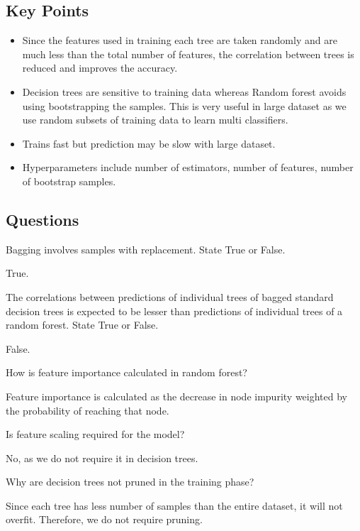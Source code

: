 \documentclass[12pt,letterpaper, onecolumn]{exam}
\begin{document}
\subsection*{Key Points}
\begin{itemize}
\item Since the features used in training each tree are taken randomly and are much less than the total number of features, the correlation between trees is reduced and improves the accuracy.
\item Decision trees are sensitive to training data whereas Random forest avoids using bootstrapping the samples. This is very useful in large dataset as we use random subsets of training data to learn multi classifiers.
\item Trains fast but prediction may be slow with large dataset.
\item Hyperparameters include number of estimators, number of features, number of bootstrap samples.
\end{itemize}

\subsection*{Questions}
\begin{questions}
\question[] Bagging involves samples with replacement. State True or False.\\
\begin{Solution}
True.
\end{Solution}
\question[] The correlations between predictions of individual trees of bagged standard decision trees  is expected to be lesser than predictions of individual trees of a random forest.
State True or False.\\
\begin{Solution}
False.
\end{Solution}
\question[] How is feature importance calculated in random forest?\\
\begin{Solution}
Feature importance is calculated as the decrease in node impurity weighted by the probability of reaching that node.
\end{Solution}
\question[] Is feature scaling required for the model?\\
\begin{Solution}
No, as we do not require it in decision trees.
\end{Solution}
\question[] Why are decision trees not pruned in the training phase?\\
\begin{Solution}
Since each tree has less number of samples than the entire dataset, it will not overfit. Therefore, we do not require pruning.
\end{Solution}
\end{questions}
\end{document}
